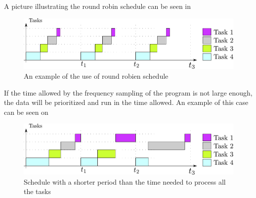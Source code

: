 A picture illustrating the round robin schedule can be seen in \\

 \begin{figure}[H]
	\centering
	\includegraphics[scale=0.5]{figures/roundRobinSchedule.pdf}
	\caption{An example of the use of round robien schedule}
	\label{roundRobinSchedule}
\end{figure}

If the time allowed by the frequency sampling of the program is not large enough, the data will be prioritized and run in the time allowed. An example of this case can be seen on 

 \begin{figure}[H]
	\centering
	\includegraphics[scale=0.5]{figures/roundRobinSchedule2.pdf}
	\caption{Schedule with a shorter period than the time needed to process all the tasks}
	\label{roundRobinSchedule2}
\end{figure}


